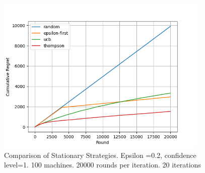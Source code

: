 \begin{figure}[h]
    \centering
    \includegraphics[width=0.9\textwidth]{figures/100machines}
    \caption[Comparison for 100 machines]{Comparison of Stationary Strategies. Epsilon =0.2, confidence level=1. 100 machines. 20000 rounds per iteration. 20 iterations}
    \label{fig: all4}
\end{figure}